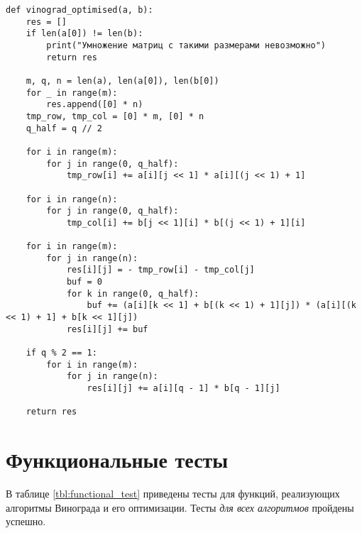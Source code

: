 \begin{center}
	\captionsetup{justification=raggedright,singlelinecheck=off}
	\begin{lstlisting}[label=lst:vinopt,caption=Оптимизированный алгоритм Винограда]
def vinograd_optimised(a, b):
	res = []
	if len(a[0]) != len(b):
		print("Умножение матриц с такими размерами невозможно")
		return res
	
	m, q, n = len(a), len(a[0]), len(b[0])
	for _ in range(m):
		res.append([0] * n)
	tmp_row, tmp_col = [0] * m, [0] * n
	q_half = q // 2
	
	for i in range(m):
		for j in range(0, q_half):
			tmp_row[i] += a[i][j << 1] * a[i][(j << 1) + 1]
	
	for i in range(n):
		for j in range(0, q_half):
			tmp_col[i] += b[j << 1][i] * b[(j << 1) + 1][i]
	
	for i in range(m):
		for j in range(n):
			res[i][j] = - tmp_row[i] - tmp_col[j]
			buf = 0
			for k in range(0, q_half):
				buf += (a[i][k << 1] + b[(k << 1) + 1][j]) * (a[i][(k << 1) + 1] + b[k << 1][j])
			res[i][j] += buf
	
	if q % 2 == 1:
		for i in range(m):
			for j in range(n):
				res[i][j] += a[i][q - 1] * b[q - 1][j]
	
	return res
	\end{lstlisting}
\end{center}

\section{Функциональные тесты}

В таблице \ref{tbl:functional_test} приведены тесты для функций, реализующих алгоритмы Винограда и его оптимизации. Тесты \textit{для всех алгоритмов} пройдены успешно.

